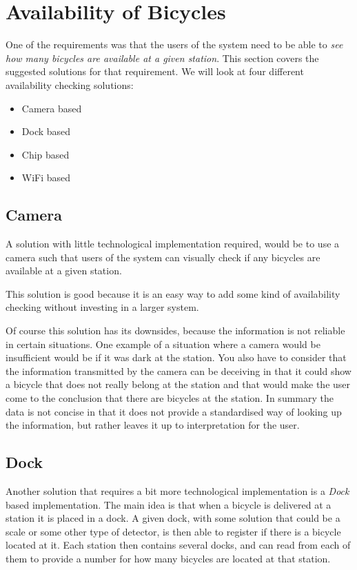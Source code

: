 \section{Availability of Bicycles}\label{sec:availability}
One of the requirements was that the users of the system need to be able to \textit{see how many bicycles are available at a given station}.
This section covers the suggested solutions for that requirement.
We will look at four different availability checking solutions:

\begin{itemize}
\item Camera based
\item Dock based
\item Chip based
\item WiFi based
\end{itemize} 


\subsection{Camera}
A solution with little technological implementation required, would be to use a camera such that users of the system can visually check if any bicycles are available at a given station. 

This solution is good because it is an easy way to add some kind of availability checking without investing in a larger system.

Of course this solution has its downsides, because the information is not reliable in certain situations. 
One example of a situation where a camera would be insufficient would be if it was dark at the station.
You also have to consider that the information transmitted by the camera can be deceiving in that it could show a bicycle that does not really belong at the station and that would make the user come to the conclusion that there are bicycles at the station.
In summary the data is not concise in that it does not provide a standardised way of looking up the information, but rather leaves it up to interpretation for the user.

\subsection{Dock}
Another solution that requires a bit more technological implementation is a \textit{Dock} based implementation.
The main idea is that when a bicycle is delivered at a station it is placed in a dock.
A given dock, with some solution that could be a scale or some other type of detector, is then able to register if there is a bicycle located at it.
Each station then contains several docks, and can read from each of them to provide a number for how many bicycles are located at that station. 

